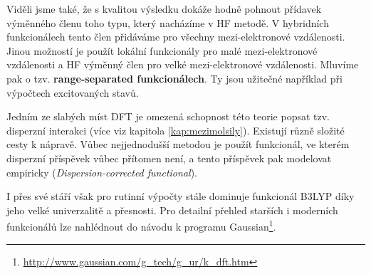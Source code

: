 Viděli jsme také, že s kvalitou výsledku dokáže hodně pohnout přídavek výměnného členu toho typu, který nacházíme v HF metodě. V hybridních funkcionálech tento člen přidáváme pro všechny mezi-elektronové vzdálenosti. Jinou možností je použít lokální funkcionály pro malé mezi-elektronové vzdálenosti a HF výměnný člen pro velké mezi-elektronové vzdálenosti. Mluvíme pak o tzv. \textbf{range-separated funkcionálech}. Ty jsou užitečné například při výpočtech excitovaných stavů. 

Jedním ze slabých míst DFT je omezená schopnost této teorie popsat tzv. disperzní interakci (více viz kapitola \ref{kap:mezimolsily}).
Existují různě složité cesty k nápravě. Vůbec nejjednodušší metodou je použít funkcionál, ve kterém disperzní příspěvek vůbec přítomen není, a tento příspěvek pak modelovat empiricky (\textit{Dispersion-corrected functional}).  


I přes své stáří však pro rutinní výpočty stále dominuje funkcionál B3LYP díky jeho velké univerzalitě a přesnosti.
Pro detailní přehled starších i moderních funkcionálů lze nahlédnout do návodu k programu Gaussian\footnote{\url{http://www.gaussian.com/g\_tech/g\_ur/k\_dft.htm}}.

